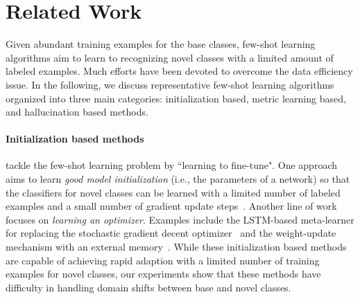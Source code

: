 \documentclass{article}
\newlength\paramargin
\begin{document}
 







\section{Related Work}
\label{sec:related}



Given abundant training examples for the base classes, few-shot learning algorithms aim to learn to recognizing novel classes with a limited amount of labeled examples. Much efforts have been devoted to overcome the data efficiency issue. In the following, we discuss representative few-shot learning algorithms organized into three main categories: initialization based, metric learning based, and hallucination based methods.

\vspace{\paramargin}
\paragraph{Initialization based methods} tackle the few-shot learning problem by ``learning to fine-tune". One approach aims to learn \emph{good model initialization} (i.e., the parameters of a network) so that the classifiers for novel classes can be learned with a limited number of labeled examples and a small number of gradient update steps~\cite{finn2017model,finn2018probabilistic,nichol2018reptile,rusu2018meta}. Another line of work focuses on \emph{learning an optimizer}. Examples include the LSTM-based meta-learner for replacing the stochastic gradient decent optimizer~\cite{ravi2017optimization} and the weight-update mechanism with an external memory~\cite{munkhdalai2017meta}.
While these initialization based methods are capable of achieving rapid adaption with a limited number of training examples for novel classes, our experiments show that these methods have difficulty in handling domain shifts between base and novel classes.












\vspace{\paramargin}
\end{document}
